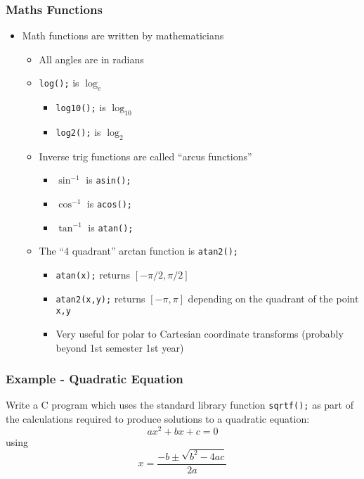 \documentclass[14pt]{beamer}
\begin{document}
\begin{frame}
\frametitle{Maths Functions}
\begin{itemize}
\item Math functions are written by mathematicians
	\begin{itemize}
		\item All angles are in radians
		\pause
		\item \texttt{log();} is $\log_e$
			\begin{itemize}
				\item \texttt{log10();} is $\log_{10}$
				\item \texttt{log2();} is $\log_2$
			\end{itemize}
		\pause
		\item Inverse trig functions are called ``arcus functions''
			\begin{itemize}
				\item $\sin^{-1}$ is \texttt{asin();}
				\item $\cos^{-1}$ is \texttt{acos();}
				\item $\tan^{-1}$ is \texttt{atan();}
			\end{itemize}
		\pause
		\item The ``4 quadrant'' arctan function is \texttt{atan2();}
			\begin{itemize}
				\item \texttt{atan(x);} returns $[-\pi/2,\pi/2]$
				\item \texttt{atan2(x,y);} returns $[-\pi, \pi]$ depending on the quadrant of the point \texttt{x,y}
				\item Very useful for polar to Cartesian coordinate transforms (probably beyond 1st semester 1st year)
			\end{itemize}
	\end{itemize}
\end{itemize}
\end{frame}

\begin{frame}
\frametitle{Example - Quadratic Equation}
Write a C program which uses the standard library function \texttt{sqrtf();} as part of the calculations required to produce solutions to a quadratic equation:
\begin{equation}
ax^2 + bx + c = 0
\end{equation}
using
\begin{equation}
x = \frac{-b \pm \sqrt{b^2 - 4ac}}{2a}
\end{equation}
\end{frame}
\end{document}
